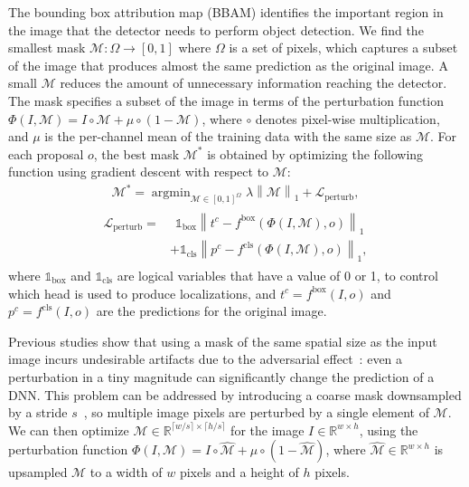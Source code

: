 \documentclass[final]{cvpr}
\newcommand{\argmin}{\mathop{\mathrm{argmin}}}
\begin{document}
The bounding box attribution map (BBAM) identifies the important region in the image that the detector needs to perform object detection.
We find the smallest mask \mbox{$\mathcal{M}: \Omega \rightarrow [0, 1]$} where $\Omega$ is a set of pixels, which captures a subset of the image that produces almost the same prediction as the original image.
A small $\mathcal{M}$ reduces the amount of unnecessary information reaching the detector.
The mask specifies a subset of the image in terms of the perturbation function $\Phi(I, \mathcal{M}) = \!I \circ \mathcal{M} \! + \! \mu \circ (1 \!-\! \mathcal{M})$, where $\circ$ denotes pixel-wise multiplication, and $\mu$ is the per-channel mean of the training data with the same size as $\mathcal{M}$.
For each proposal $o$, the best mask $\mathcal{M}^{*}$ is obtained by optimizing the following function using gradient descent with respect to $\mathcal{M}$:
\begin{align}\label{eq_mask}
\mathcal{M}^{*} = \argmin_{\mathcal{M} \in [0, 1]^{\Omega}} \lambda \left\lVert \mathcal{M} \right\rVert_1 + \mathcal{L}_\text{perturb},
\end{align}
\vspace{-1em}
\begin{align}\label{eq_mask_perturb}
\begin{split}
\mathcal{L}_\text{perturb} = & \hspace{5pt}\mathbb{1}_{\text{box}} \left\lVert t^c - f^{\text{box}}(\Phi(I, \mathcal{M}), o) \right\rVert_1\\ &+ \mathbb{1}_{\text{cls}} \left\lVert p^c - f^{\text{cls}}(\Phi(I, \mathcal{M}), o) \right\rVert_1,
\end{split}
\end{align}
where $\mathbb{1}_{\text{box}}$ and $\mathbb{1}_{\text{cls}}$ are logical variables that have a value of 0 or 1, to control which head is used to produce localizations,
and $t^c = f^{\text{box}}(I, o)$ and $p^c = f^{\text{cls}}(I, o)$ are the predictions for the original image. 



Previous studies show that using a mask of the same spatial size as the input image incurs undesirable artifacts due to the adversarial effect~\cite{goodfellow2014explaining}: even a perturbation in a tiny magnitude can significantly change the prediction of a DNN.
This problem can be addressed by introducing a coarse mask downsampled by a stride $s$~\cite{fong2017interpretable, fong2019understanding, dabkowski2017real, hoyer2019grid}, so multiple image pixels are perturbed by a single element of $\mathcal{M}$. 
We can then optimize $\mathcal{M} \in \mathbb{R}^{\lceil w/s \rceil \times \lceil h/s \rceil}$ for the image $I \in \mathbb{R}^{w \times h}$, using the perturbation function $\Phi(I, \mathcal{M}) = I \circ \hat{\mathcal{M}} + \mu \circ (1 - \hat{\mathcal{M}})$, where $\hat{\mathcal{M}} \in \mathbb{R}^{w \times h}$ is upsampled $\mathcal{M}$ to a width of $w$ pixels and a height of $h$ pixels.
\end{document}
